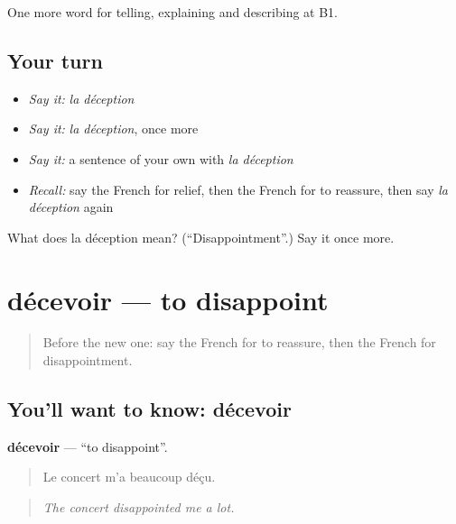 \begin{grammarlens}[title={What you've built}]
One more word for telling, explaining and describing at B1.
\end{grammarlens}

\subsection*{Your turn}
\begin{itemize}
\raggedright
  \item \emph{Say it:} \emph{la déception}
  \item \emph{Say it:} \emph{la déception}, once more
  \item \emph{Say it:} a sentence of your own with \emph{la déception}
  \item \emph{Recall:} say the French for relief, then the French for to reassure, then say \emph{la déception} again
\end{itemize}

\begin{tcolorbox}[breakable,colback=teal!4,colframe=teal!35!black,title={Before you move on}]
What does la déception mean? (\textquotedblleft{}Disappointment\textquotedblright{}.) Say it once more.
\end{tcolorbox}
\section[décevoir]{décevoir — to disappoint}

\label{lesson:FR-C471-decevoir}



\begin{quote}
Before the new one: say the French for to reassure, then the French for disappointment.
\end{quote}

\subsection*{You'll want to know: décevoir}
\textbf{décevoir} — \textquotedblleft{}to disappoint\textquotedblright{}.

\begin{quote}
Le concert m'a beaucoup déçu.
\end{quote}

\begin{quote}
\emph{The concert disappointed me a lot.}
\end{quote}

